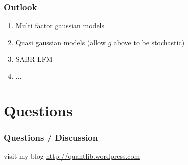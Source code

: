 \documentclass{beamer}
\begin{document}
\begin{frame}
\frametitle{Outlook}
\begin{enumerate}
\item Multi factor gaussian models
\item Quasi gaussian models (allow $g$ above to be stochastic)
\item SABR LFM
\item ...
\end{enumerate}
\end{frame}

\section{Questions}

\begin{frame}[fragile]
\frametitle{Questions / Discussion}
\begin{center}
visit my blog \href{http://quantlib.wordpress.com}{http://quantlib.wordpress.com}
\end{center}
\end{frame}
\end{document}
